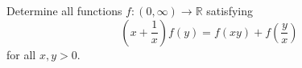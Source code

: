 Determine all functions $f : (0, \infty) \to \mathbb{R}$ satisfying
\[ \left(x + \frac{1}{x}\right) f(y) = f(xy) + f\left(\frac{y}{x}\right) \]
for all $x, y > 0$.
